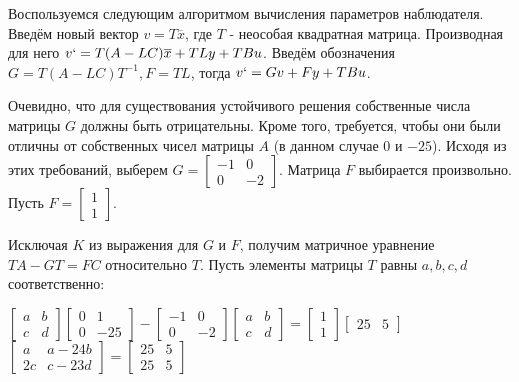 \documentclass[14pt,a4paper,report]{report}
\begin{document}
Воспользуемся следующим алгоритмом вычисления параметров наблюдателя. Введём новый вектор $v=T\overline{x}$, где $T$ - неособая квадратная матрица. Производная для него $v`=T(A-LC)\overline{x}+TLy+TBu$. Введём обозначения $G=T(A-LC)T^{-1}, F=TL$, тогда $v`=Gv+Fy+TBu$.

Очевидно, что для существования устойчивого решения собственные числа матрицы $G$ должны быть отрицательны. Кроме того, требуется, чтобы они были отличны от собственных чисел матрицы $A$ (в данном случае $0$ и $-25$). Исходя из этих требований, выберем $G=\begin{bmatrix} -1 & 0 \\ 0 & -2 \end{bmatrix}$. Матрица $F$ выбирается произвольно. Пусть $F=\begin{bmatrix} 1 \\ 1 \end{bmatrix}$.

\clearpage

Исключая $K$ из выражения для $G$ и $F$, получим матричное уравнение $TA-GT=FC$ относительно $T$. Пусть элементы матрицы $T$ равны $a,b,c,d$ соответственно:

\begin{center}
	$\begin{bmatrix} a & b \\ c & d \end{bmatrix}
	\begin{bmatrix} 0 & 1 \\ 0 & -25 \end{bmatrix}-
	\begin{bmatrix} -1 & 0 \\ 0 & -2 \end{bmatrix}
	\begin{bmatrix} a & b \\ c & d \end{bmatrix}=
	\begin{bmatrix} 1 \\ 1 \end{bmatrix}
	\begin{bmatrix} 25 & 5 \end{bmatrix}$\\
	$\begin{bmatrix} a & a-24b \\ 2c & c-23d \end{bmatrix}=
	\begin{bmatrix} 25 & 5 \\ 25 & 5 \end{bmatrix}$
\end{center}
\end{document}
